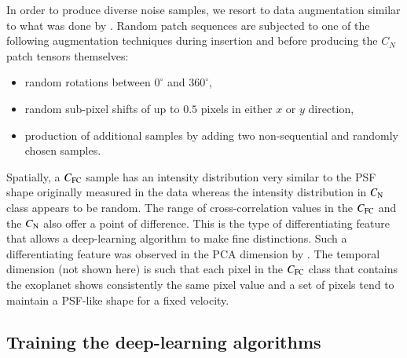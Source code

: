 \documentclass[referee]{aa} %
\begin{document}
In order to produce diverse noise samples, we resort to data augmentation similar to what was done by \cite{2018Gomez}.
Random patch sequences are subjected to one of the following augmentation techniques during insertion and before producing the $C_{N}$ patch tensors themselves:
\begin{itemize}
    \item random rotations between $0^{\circ}$ and $360^{\circ}$,
    \item random sub-pixel shifts of up to $0.5$ pixels in either $x$ or $y$ direction,
    \item production of additional samples by adding two non-sequential and randomly chosen samples.
\end{itemize}
Spatially, a $C_{\rm FC}$ sample has an intensity distribution very similar to the PSF shape originally measured in the data whereas the intensity distribution in $C_{\rm N}$ class appears to be random.
The range of cross-correlation values in the $C_{\rm FC}$ and the $C_{\rm N}$ also offer a point of difference.
This is the type of differentiating feature that allows a deep-learning algorithm to make fine distinctions.
Such a differentiating feature was observed in the PCA dimension by \citet{2018Gomez}.
The temporal dimension (not shown here) is such that each pixel in the $C_{\rm FC}$ class that contains the exoplanet shows consistently the same pixel value and a set of pixels tend to maintain a PSF-like shape for a fixed velocity. 
\subsection{Training the deep-learning algorithms}
\end{document}
